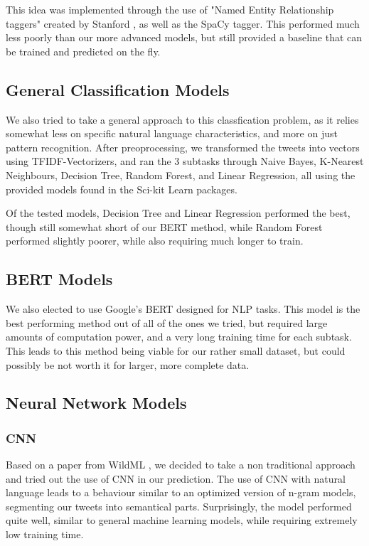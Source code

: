 \documentclass[a4paper, 12pt]{article}
\begin{document}
\begin{multicols}{2}
                This idea was implemented through the use of "Named Entity Relationship taggers" created by Stanford \cite{stanNER}, as well as the SpaCy \cite{spacy2} tagger. This performed much less poorly than our more advanced models, but still provided a baseline that can be trained and predicted on the fly.
        \subsection{General Classification Models}
            We also tried to take a general approach to this classfication problem, as it relies somewhat less on specific natural language characteristics, and more on just pattern recognition. After preoprocessing, we transformed the tweets into vectors using TFIDF-Vectorizers, and ran the 3 subtasks through Naive Bayes, K-Nearest Neighbours, Decision Tree, Random Forest, and Linear Regression, all using the provided models found in the Sci-kit Learn \cite{scikit-learn} packages.

            Of the tested models, Decision Tree and Linear Regression performed the best, though still somewhat short of our BERT method, while Random Forest performed slightly poorer, while also requiring much longer to train.
        \subsection{BERT Models}
            We also elected to use Google's BERT \cite{bert} designed for NLP tasks. This model is the best performing method out of all of the ones we tried, but required large amounts of computation power, and a very long training time for each subtask. This leads to this method being viable for our rather small dataset, but could possibly be not worth it for larger, more complete data.
        \subsection{Neural Network Models}
            \subsubsection{CNN}
                Based on a paper from WildML \cite{wildML}, we decided to take a non traditional approach and tried out the use of CNN in our prediction. The use of CNN with natural language leads to a behaviour similar to an optimized version of n-gram models, segmenting our tweets into semantical parts. Surprisingly, the model performed quite well, similar to general machine learning models, while requiring extremely low training time.

\end{multicols}
\end{document}
